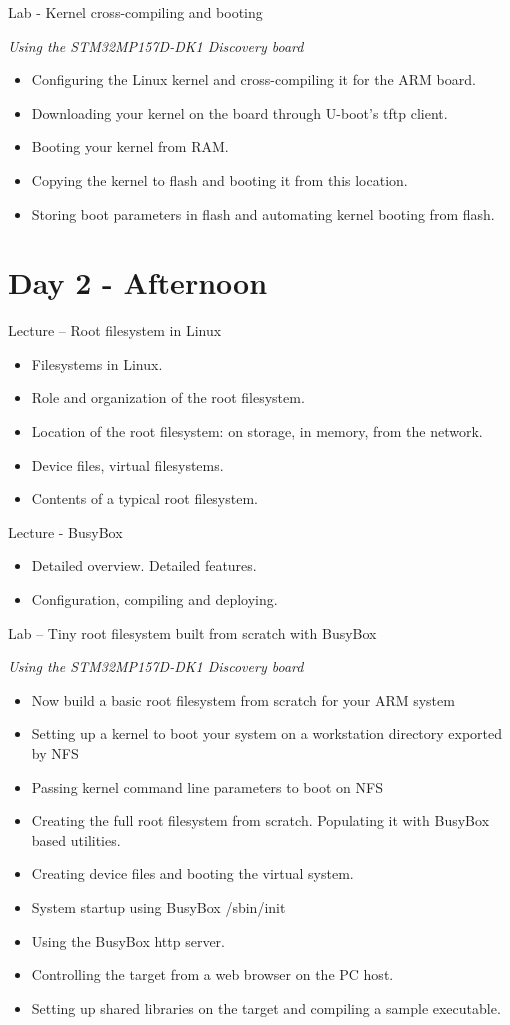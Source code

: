 \documentclass[a4paper,12pt,obeyspaces,spaces,hyphens]{article}
\begin{document}
\feagendaonecolumn
{Lab - Kernel cross-compiling and booting}
{
  {\em Using the STM32MP157D-DK1 Discovery board}
  \begin{itemize}
  \item Configuring the Linux kernel and cross-compiling it for the ARM board.
  \item Downloading your kernel on the board through U-boot's tftp client.
  \item Booting your kernel from RAM.
  \item Copying the kernel to flash and booting it from this location.
  \item Storing boot parameters in flash and automating kernel booting from flash.
  \end{itemize}
}

\section{Day 2 - Afternoon}

\feagendatwocolumn
{Lecture – Root filesystem in Linux}
{
  \begin{itemize}
  \item Filesystems in Linux.
  \item Role and organization of the root filesystem.
  \item Location of the root filesystem: on storage, in memory,
        from the network.
  \item Device files, virtual filesystems.
  \item Contents of a typical root filesystem.
  \end{itemize}
}
{Lecture - BusyBox}
{
  \begin{itemize}
  \item Detailed overview. Detailed features.
  \item Configuration, compiling and deploying.
  \end{itemize}
}

\feagendaonecolumn
{Lab – Tiny root filesystem built from scratch with BusyBox}
{
  {\em Using the STM32MP157D-DK1 Discovery board}
  \begin{itemize}
  \item Now build a basic root filesystem from scratch for your ARM system
  \item Setting up a kernel to boot your system on a workstation
        directory exported by NFS
  \item Passing kernel command line parameters to boot on NFS
  \item Creating the full root filesystem from scratch.
        Populating it with BusyBox based utilities.
  \item Creating device files and booting the virtual system.
  \item System startup using BusyBox /sbin/init
  \item Using the BusyBox http server.
  \item Controlling the target from a web browser on the PC host.
  \item Setting up shared libraries on the target and compiling
        a sample executable.
  \end{itemize}
}
\end{document}
